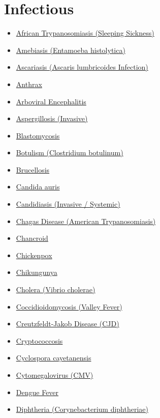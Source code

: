 \section*{Infectious}
\label{sec:organ_infectious}
\begin{itemize}[noitemsep]
  \item \hyperlink{sec:African Trypanosomiasis}{African Trypanosomiasis (Sleeping Sickness)}
  \item \hyperlink{sec:Amebiasis}{Amebiasis (Entamoeba histolytica)}
  \item \hyperlink{sec:Ascariasis (Ascaris lumbricoides Infection)}{Ascariasis (Ascaris lumbricoides Infection)}
  \item \hyperlink{sec:Anthrax}{Anthrax}
  \item \hyperlink{sec:Arboviral Encephalitis}{Arboviral Encephalitis}
  \item \hyperlink{sec:Aspergillosis Invasive}{Aspergillosis (Invasive)}
  \item \hyperlink{sec:Blastomycosis}{Blastomycosis}
  \item \hyperlink{sec:Botulism}{Botulism (Clostridium botulinum)}
  \item \hyperlink{sec:Brucellosis}{Brucellosis}
  \item \hyperlink{sec:Candida auris}{Candida auris}
  \item \hyperlink{sec:Candidiasis Systemic}{Candidiasis (Invasive / Systemic)}
  \item \hyperlink{sec:Chagas Disease}{Chagas Disease (American Trypanosomiasis)}
  \item \hyperlink{sec:Chancroid}{Chancroid}
  \item \hyperlink{sec:Chickenpox}{Chickenpox}
  \item \hyperlink{sec:Chikungunya}{Chikungunya}
  \item \hyperlink{sec:Cholera}{Cholera (Vibrio cholerae)}
  \item \hyperlink{sec:Coccidioidomycosis}{Coccidioidomycosis (Valley Fever)}
  \item \hyperlink{sec:Creutzfeldt-Jakob Disease}{Creutzfeldt-Jakob Disease (CJD)}
  \item \hyperlink{sec:Cryptococcosis}{Cryptococcosis}
  \item \hyperlink{sec:Cyclospora}{Cyclospora cayetanensis}
  \item \hyperlink{sec:Cytomegalovirus}{Cytomegalovirus (CMV)}
  \item \hyperlink{sec:Dengue Fever}{Dengue Fever}
  \item \hyperlink{sec:Diphtheria}{Diphtheria (Corynebacterium diphtheriae)}

\end{itemize}
